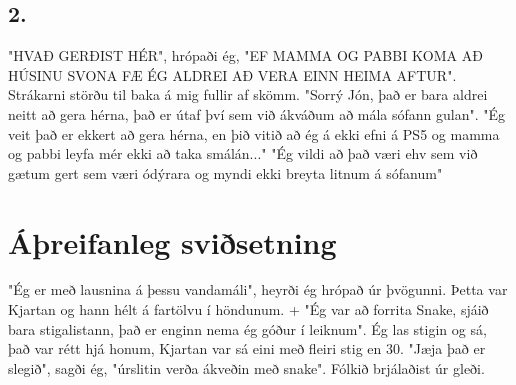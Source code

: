 \documentclass{article}
\begin{document}
\subsection*{2.}
"HVAÐ GERÐIST HÉR", hrópaði ég, 
"EF MAMMA OG PABBI KOMA AÐ HÚSINU SVONA FÆ ÉG ALDREI AÐ VERA EINN HEIMA AFTUR".
Strákarni störðu til baka á mig fullir af skömm. 
"Sorrý Jón, það er bara aldrei neitt að gera hérna,
það er útaf því sem við ákváðum að mála sófann gulan".
"Ég veit það er ekkert að gera hérna, 
en þið vitið að ég á ekki efni á PS5 og mamma og pabbi leyfa mér ekki að taka smálán..."
"Ég vildi að það væri ehv sem við gætum gert sem væri ódýrara og myndi ekki breyta litnum á sófanum"

\section*{Áþreifanleg sviðsetning}
"Ég er með lausnina á þessu vandamáli", heyrði ég hrópað úr þvögunni. 
Þetta var Kjartan og hann hélt á fartölvu í höndunum. +
"Ég var að forrita Snake, sjáið bara stigalistann, það er enginn nema ég góður í leiknum".
Ég las stigin og sá, það var rétt hjá honum, Kjartan var sá eini með fleiri stig en 30. 
"Jæja það er slegið", sagði ég, "úrslitin verða ákveðin með snake". 
Fólkið brjálaðist úr gleði.
\end{document}
